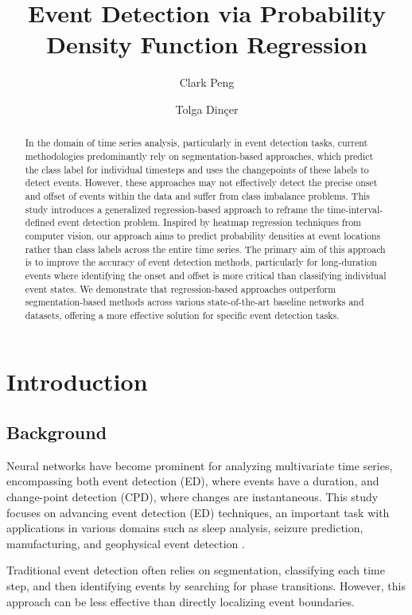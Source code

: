 \documentclass{article}
\title{Event Detection via Probability Density Function Regression}
\author[1]{Clark Peng}
\author[2]{Tolga Dinçer}
\affil[1]{University of California, Los Angeles, CA, USA}
\affil[2]{Colgate University, Information Technology Services, Hamilton, NY, USA}
\date{}
\begin{document}
\maketitle
\begin{abstract}
\noindent In the domain of time series analysis, particularly in event detection tasks, current methodologies predominantly rely on segmentation-based approaches, which predict the class label for individual timesteps and uses the changepoints of these labels to detect events. However, these approaches may not effectively detect the precise onset and offset of events within the data and suffer from class imbalance problems. This study introduces a generalized regression-based approach to reframe the time-interval-defined event detection problem. Inspired by heatmap regression techniques from computer vision, our approach aims to predict probability densities at event locations rather than class labels across the entire time series. The primary aim of this approach is to improve the accuracy of event detection methods, particularly for long-duration events where identifying the onset and offset is more critical than classifying individual event states. We demonstrate that regression-based approaches outperform segmentation-based methods across various state-of-the-art baseline networks and datasets, offering a more effective solution for specific event detection tasks.

\end{abstract}

\section{Introduction}
\label{section:intro}

\subsection{Background}

Neural networks have become prominent for analyzing multivariate time series, encompassing both event detection (ED), where events have a duration, and change-point detection (CPD), where changes are instantaneous. This study focuses on advancing event detection (ED) techniques, an important task with applications in various domains such as sleep analysis, seizure prediction, manufacturing, and geophysical event detection \citep{azib2023,phan2019,perslev2019}. 

Traditional event detection often relies on segmentation, classifying each time step, and then identifying events by searching for phase transitions. However, this approach can be less effective than directly localizing event boundaries.
\end{document}
